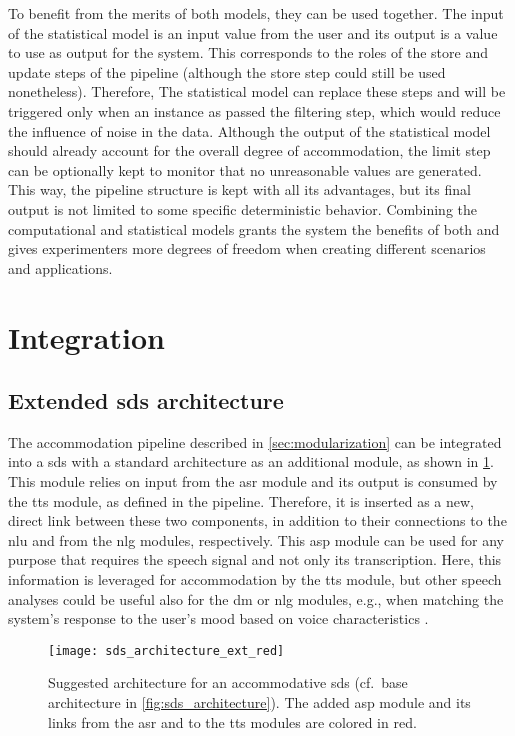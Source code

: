 To benefit from the merits of both models, they can be used together.
The input of the statistical model is an input value from the user and its output is a value to use as output for the system.
This corresponds to the roles of the store and update steps of the pipeline (although the store step could still be used nonetheless).
Therefore, The statistical model can replace these steps and will be triggered only when an instance as passed the filtering step, which would reduce the influence of noise in the data.
Although the output of the statistical model should already account for the overall degree of accommodation, the limit step can be optionally kept to monitor that no unreasonable values are generated.
This way, the pipeline structure is kept with all its advantages, but its final output is not limited to some specific deterministic behavior.
Combining the computational and statistical models grants the system the benefits of both and gives experimenters more degrees of freedom when creating different scenarios and applications.

\section{Integration}
\label{sec:integration}

\subsection{Extended \acl{sds} architecture}
\label{subsec:extended_sds}

The accommodation pipeline described in \cref{sec:modularization} can be integrated into a \ac{sds} with a standard architecture as an additional module, as shown in \cref{fig:adaptation_module_architecture}.
This module relies on input from the \ac{asr} module and its output is consumed by the \ac{tts} module, as defined in the pipeline.
Therefore, it is inserted as a new, direct link between these two components, in addition to their connections to the \ac{nlu} and from the \ac{nlg} modules, respectively.
This \acf{asp} module can be used for any purpose that requires the speech signal and not only its transcription.
Here, this information is leveraged for accommodation by the \ac{tts} module, but other speech analyses could be useful also for the \ac{dm} or \ac{nlg} modules, e.g., when matching the system's response to the user's mood based on voice characteristics \citep{Braun2016assessing, Rothkrantz2004voice}.
%
\begin{figure}[t]
	\centering
	\texttt{[image: sds\_architecture\_ext\_red]}
	\caption[Proposed architecture for an accommodative \acl{sds}]
		{Suggested architecture for an accommodative \acl{sds} (cf.\ base architecture in \cref{fig:sds_architecture}).
		The added \acs{asp} module and its links from the \acs{asr} and to the \acs{tts} modules are colored in red.}
	\label{fig:adaptation_module_architecture}
\end{figure}

